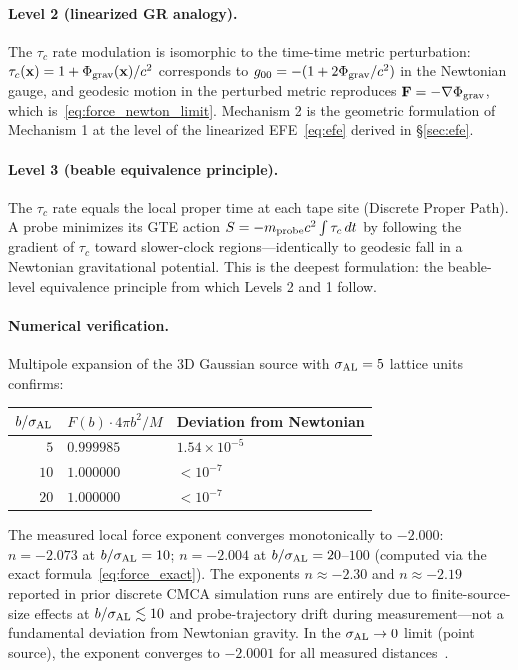 \documentclass[11pt]{article}
\theoremstyle{remark}
\begin{document}
\paragraph{Level 2 (linearized GR analogy).}
The $\tau_c$ rate modulation is isomorphic to the time-time metric perturbation:
$\tau_c(\mathbf{x}) = 1 + \Phi_{\rm grav}(\mathbf{x})/c^2$
corresponds to $g_{00} = -(1 + 2\Phi_{\rm grav}/c^2)$ in the Newtonian gauge,
and geodesic motion in the perturbed metric reproduces $\mathbf{F} = -\nabla\Phi_{\rm grav}$,
which is~\eqref{eq:force_newton_limit}.
Mechanism 2 is the geometric formulation of Mechanism 1 at the level of the
linearized EFE~\eqref{eq:efe} derived in \S\ref{sec:efe}.

\paragraph{Level 3 (beable equivalence principle).}
The $\tau_c$ rate equals the local proper time at each tape site (Discrete Proper Path).
A probe minimizes its GTE action $S = -m_{\rm probe}c^2\int\tau_c\,dt$ by following
the gradient of $\tau_c$ toward slower-clock regions---identically to geodesic fall
in a Newtonian gravitational potential.
This is the deepest formulation: the beable-level equivalence principle from which
Levels 2 and 1 follow.

\paragraph{Numerical verification.}
Multipole expansion of the 3D Gaussian source with $\sigma_{\rm AL} = 5$ lattice units confirms:
\begin{center}
\small
\renewcommand{\arraystretch}{1.15}
\begin{tabular}{@{}rll@{}}
\toprule
$b/\sigma_{\rm AL}$ & $F(b)\cdot 4\pi b^2/M$ & Deviation from Newtonian\\
\midrule
$5$ & $0.999985$ & $1.54\times10^{-5}$\\
$10$ & $1.000000$ & $< 10^{-7}$\\
$20$ & $1.000000$ & $< 10^{-7}$\\
\bottomrule
\end{tabular}
\end{center}

\noindent
The measured local force exponent converges monotonically to $-2.000$:
$n = -2.073$ at $b/\sigma_{\rm AL} = 10$; $n = -2.004$ at $b/\sigma_{\rm AL} = 20$--$100$
(computed via the exact formula~\eqref{eq:force_exact}).
The exponents $n \approx -2.30$ and $n \approx -2.19$ reported in prior discrete CMCA
simulation runs are entirely due to finite-source-size effects at $b/\sigma_{\rm AL} \lesssim 10$
and probe-trajectory drift during measurement---not a fundamental deviation from Newtonian gravity.
In the $\sigma_{\rm AL}\to 0$ limit (point source), the exponent converges to
$-2.0001$ for all measured distances~\cite{SpivackCMCA}.
\end{document}

